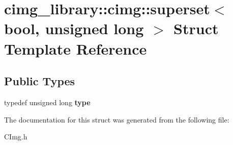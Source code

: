 \hypertarget{structcimg__library_1_1cimg_1_1superset_3_01bool_00_01unsigned_01long_01_4}{\section{cimg\-\_\-library\-:\-:cimg\-:\-:superset$<$ bool, unsigned long $>$ Struct Template Reference}
\label{structcimg__library_1_1cimg_1_1superset_3_01bool_00_01unsigned_01long_01_4}
}
\subsection*{Public Types}
\begin{DoxyCompactItemize}
\item 
\hypertarget{structcimg__library_1_1cimg_1_1superset_3_01bool_00_01unsigned_01long_01_4_ad80eb551c929b2bf8f1a90fa936a1c6f}{typedef unsigned long {\bfseries type}}\label{structcimg__library_1_1cimg_1_1superset_3_01bool_00_01unsigned_01long_01_4_ad80eb551c929b2bf8f1a90fa936a1c6f}

\end{DoxyCompactItemize}


The documentation for this struct was generated from the following file\-:\begin{DoxyCompactItemize}
\item 
C\-Img.\-h\end{DoxyCompactItemize}
